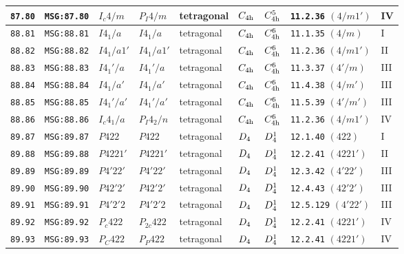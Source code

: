 \documentclass[fleqn,10pt]{jsarticle}
\begin{document}
\begin{center}
\begin{longtable}{lllllllll}
\texttt{87.80} & \texttt{MSG:87.80} & $I_{c}4/m$ & $P_{I}4/m$ & tetragonal & $C_{\rm 4h}$ & $C_{\rm 4h}^{5}$ & \texttt{11.2.36} $(4/m1')$ & IV \\ \hline
\texttt{88.81} & \texttt{MSG:88.81} & $I4_{1}/a$ & $I4_{1}/a$ & tetragonal & $C_{\rm 4h}$ & $C_{\rm 4h}^{6}$ & \texttt{11.1.35} $(4/m)$ & I \\
\texttt{88.82} & \texttt{MSG:88.82} & $I4_{1}/a1'$ & $I4_{1}/a1'$ & tetragonal & $C_{\rm 4h}$ & $C_{\rm 4h}^{6}$ & \texttt{11.2.36} $(4/m1')$ & II \\
\texttt{88.83} & \texttt{MSG:88.83} & $I4_{1}'/a$ & $I4_{1}'/a$ & tetragonal & $C_{\rm 4h}$ & $C_{\rm 4h}^{6}$ & \texttt{11.3.37} $(4'/m)$ & III \\
\texttt{88.84} & \texttt{MSG:88.84} & $I4_{1}/a'$ & $I4_{1}/a'$ & tetragonal & $C_{\rm 4h}$ & $C_{\rm 4h}^{6}$ & \texttt{11.4.38} $(4/m')$ & III \\
\texttt{88.85} & \texttt{MSG:88.85} & $I4_{1}'/a'$ & $I4_{1}'/a'$ & tetragonal & $C_{\rm 4h}$ & $C_{\rm 4h}^{6}$ & \texttt{11.5.39} $(4'/m')$ & III \\
\texttt{88.86} & \texttt{MSG:88.86} & $I_{c}4_{1}/a$ & $P_{I}4_{2}/n$ & tetragonal & $C_{\rm 4h}$ & $C_{\rm 4h}^{6}$ & \texttt{11.2.36} $(4/m1')$ & IV \\ \hline
\texttt{89.87} & \texttt{MSG:89.87} & $P422$ & $P422$ & tetragonal & $D_{\rm 4}$ & $D_{\rm 4}^{1}$ & \texttt{12.1.40} $(422)$ & I \\
\texttt{89.88} & \texttt{MSG:89.88} & $P4221'$ & $P4221'$ & tetragonal & $D_{\rm 4}$ & $D_{\rm 4}^{1}$ & \texttt{12.2.41} $(4221')$ & II \\
\texttt{89.89} & \texttt{MSG:89.89} & $P4'22'$ & $P4'22'$ & tetragonal & $D_{\rm 4}$ & $D_{\rm 4}^{1}$ & \texttt{12.3.42} $(4'22')$ & III \\
\texttt{89.90} & \texttt{MSG:89.90} & $P42'2'$ & $P42'2'$ & tetragonal & $D_{\rm 4}$ & $D_{\rm 4}^{1}$ & \texttt{12.4.43} $(42'2')$ & III \\
\texttt{89.91} & \texttt{MSG:89.91} & $P4'2'2$ & $P4'2'2$ & tetragonal & $D_{\rm 4}$ & $D_{\rm 4}^{1}$ & \texttt{12.5.129} $(4'22')$ & III \\
\texttt{89.92} & \texttt{MSG:89.92} & $P_{c}422$ & $P_{2c}422$ & tetragonal & $D_{\rm 4}$ & $D_{\rm 4}^{1}$ & \texttt{12.2.41} $(4221')$ & IV \\
\texttt{89.93} & \texttt{MSG:89.93} & $P_{C}422$ & $P_{P}422$ & tetragonal & $D_{\rm 4}$ & $D_{\rm 4}^{1}$ & \texttt{12.2.41} $(4221')$ & IV \\

\end{longtable}
\end{center}
\end{document}
